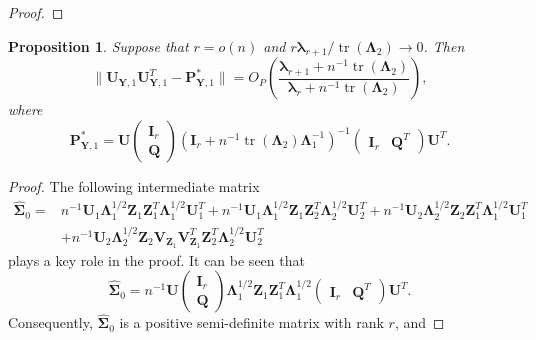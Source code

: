 \documentclass[12pt]{article} %
\DeclareMathOperator{\mytr}{tr}
\newcommand{\bQ}{\mathbf{Q}}
\newcommand{\bZ}{\mathbf{Z}}
\newcommand{\bP}{\mathbf{P}}
\newcommand{\bY}{\mathbf{Y}}
\newcommand{\bI}{\mathbf{I}}
\newcommand{\bU}{\mathbf{U}}
\newcommand{\bV}{\mathbf{V}}
\newcommand{\bfsym}[1]{\ensuremath{\boldsymbol{#1}}}
\def\blambda {\bfsym {\lambda}}
\def\bLambda {\bfsym {\Lambda}}
\def\bSigma {\bfsym {\Sigma}}
\newtheorem{proposition}{Proposition}
\theoremstyle{definition}
\begin{document}
\begin{appendices}
\begin{proof}
\end{proof}

\begin{proposition}\label{newEigenvectorProp}
    Suppose that $r=o(n)$ and $r\blambda_{r+1} /\mytr(\bLambda_2)\to 0$. Then
    \begin{equation*}
        \|\bU_{\bY,1}\bU_{\bY,1}^T -\bP_{\bY,1}^* \|
        =O_P\left(\frac{\blambda_{r+1}+n^{-1}\mytr(\bLambda_2)}{\blambda_r +n^{-1}\mytr(\bLambda_2)}\right),
    \end{equation*}
    where
    \begin{equation*}
        \bP_{\bY,1}^*=
    \bU
    \begin{pmatrix}
       \bI_r \\
       \bQ
    \end{pmatrix}
    \left(\bI_r+ n^{-1}\mytr(\bLambda_2)\bLambda_1^{-1}\right)^{-1}
    \begin{pmatrix}
        \bI_r
          &
          \bQ^T
        \end{pmatrix}
        \bU^T.
    \end{equation*}
\end{proposition}
\begin{proof}
    The following intermediate matrix
    \begin{equation*}
        \begin{split}
    \hat{\bSigma}_0 =&
    n^{-1}\bU_1 \bLambda_1^{1/2} \bZ_1 \bZ_1^T \bLambda_1^{1/2}\bU_1^T
    +n^{-1}\bU_1 \bLambda_1^{1/2} \bZ_1 \bZ_2^T \bLambda_2^{1/2}\bU_2^T
    +n^{-1}\bU_2 \bLambda_2^{1/2} \bZ_2 \bZ_1^T \bLambda_1^{1/2}\bU_1^T
    \\
    &+n^{-1}\bU_2 \bLambda_2^{1/2} \bZ_2 \bV_{\bZ_1}\bV_{\bZ_1}^T
    \bZ_2^T \bLambda_2^{1/2}\bU_2^T
        \end{split}
    \end{equation*}
    plays a key role in the proof.
    It can be seen that 
    \begin{equation*}
        \hat{\bSigma}_0=n^{-1}
    \bU
    \begin{pmatrix}
       \bI_r \\
       \bQ
    \end{pmatrix}
    \bLambda_1^{1/2}\bZ_1 \bZ_1^T\bLambda_1^{1/2}
    \begin{pmatrix}
        \bI_r
          &
          \bQ^T
        \end{pmatrix}
        \bU^T.
    \end{equation*}
    Consequently, $\hat{\bSigma}_0$ is a positive semi-definite matrix with rank $r$, and 

\end{proof}
\end{appendices}
\end{document}
